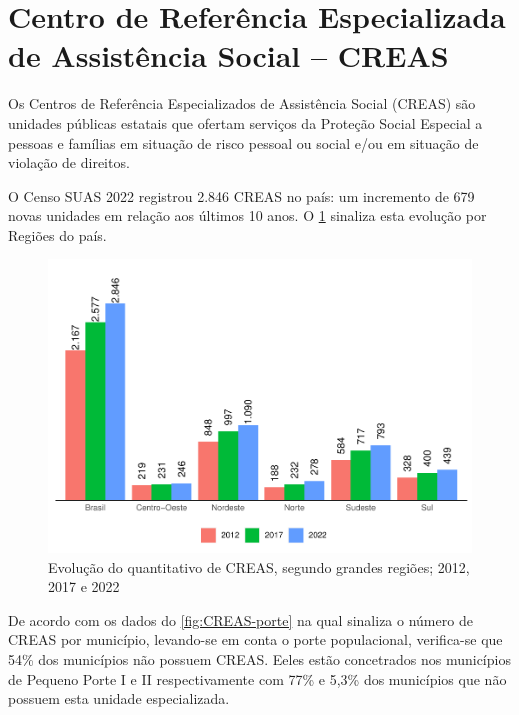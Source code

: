 \documentclass[
  brazilian]{report}
\begin{document}
\hypertarget{centro-de-referuxeancia-especializada-de-assistuxeancia-social-creas}{%
\section{Centro de Referência Especializada de Assistência Social --
CREAS}\label{centro-de-referuxeancia-especializada-de-assistuxeancia-social-creas}}

Os Centros de Referência Especializados de Assistência Social (CREAS)
são unidades públicas estatais que ofertam serviços da Proteção Social
Especial a pessoas e famílias em situação de risco pessoal ou social
e/ou em situação de violação de direitos.

O Censo SUAS 2022 registrou 2.846 CREAS no país: um incremento de 679
novas unidades em relação aos últimos 10 anos. O
\cref{fig:creas-quantitativo} sinaliza esta evolução por Regiões do
país.

\begin{figure}
\includegraphics{Censo-SUAS-2022_files/figure-latex/creas-quantitativo-1} \caption[Evolução do quantitativo de CREAS, segundo grandes regiões]{Evolução do quantitativo de CREAS, segundo grandes regiões; 2012, 2017 e 2022}\label{fig:creas-quantitativo}
\end{figure}

De acordo com os dados do \cref{fig:CREAS-porte} na qual sinaliza o
número de CREAS por município, levando-se em conta o porte populacional,
verifica-se que 54\% dos municípios não possuem CREAS. Eeles estão
concetrados nos municípios de Pequeno Porte I e II respectivamente com
77\% e 5,3\% dos municípios que não possuem esta unidade especializada.
\end{document}
